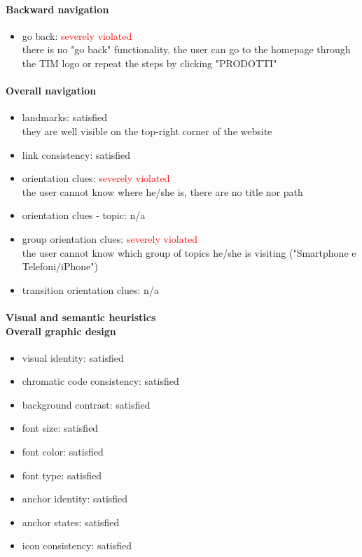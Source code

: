 \begin{enumerate}
	\paragraph*{Backward navigation}
	\begin{itemize}
		\item go back: \textcolor{red}{severely violated}\\
		there is no "go back" functionality, the user can go to the homepage through the TIM logo or repeat the steps by clicking "PRODOTTI"
	\end{itemize}
	
	\paragraph*{Overall navigation}
	\begin{itemize}
		\item landmarks: satisfied\\
		they are well visible on the top-right corner of the website 
		\item link consistency: satisfied
		\item orientation clues: \textcolor{red}{severely violated}\\
		the user cannot know where he/she is, there are no title nor path
		\item orientation clues - topic: n/a
		\item group orientation clues: \textcolor{red}{severely violated}\\
		the user cannot know which group of topics he/she is visiting ("Smartphone e Telefoni/iPhone")
		\item transition orientation clues: n/a
	\end{itemize}	
	
	\paragraph*{Visual and semantic heuristics \\ Overall graphic design }
	\begin{itemize}
		\item visual identity: satisfied
		\item chromatic code consistency: satisfied
		\item background contrast: satisfied
		\item font size: satisfied
		\item font color: satisfied
		\item font type: satisfied
		\item anchor identity: satisfied
		\item anchor states: satisfied
		\item icon consistency: satisfied
	\end{itemize}
	

\end{enumerate}
